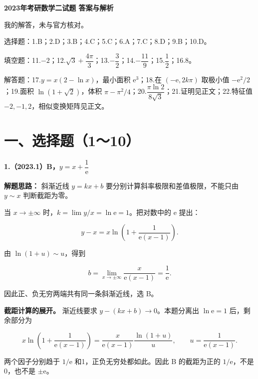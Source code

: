 \documentclass[UTF8,11pt,fontset=windows]{ctexart}
\begin{document}
{\LARGE\bfseries 2023年考研数学二试题 答案与解析\par}\vspace{6pt}

\begingroup\color{gray}我的解答，未与官方核对。\par\endgroup

\begingroup\color{gray}选择题：1.B；2.D；3.B；4.C；5.C；6.A；7.C；8.D；9.B；10.D。\par\endgroup

\begingroup\color{gray}填空题：11.$-2$；12.$\sqrt3+\dfrac{4\pi}{3}$；13.$-\dfrac32$；14.$-\dfrac{11}{9}$；15.$\dfrac12$；16.$8$。\par\endgroup

\begingroup\color{gray}解答题：17.$y=x(2-\ln x)$，最小面积 $\mathrm e^3$；18.在 $(-\mathrm e,2k\pi)$ 取极小值 $-\mathrm e^2/2$；19.面积 $\ln(1+\sqrt2)$，体积 $\pi-\pi^2/4$；20.$\dfrac{\pi\ln2}{8\sqrt3}$；21.证明见正文；22.特征值 $-2,-1,2$，相似变换矩阵见正文。\par\endgroup

\clearpage

\section*{一、选择题（1～10）}

\textbf{1.（2023.1）B，$y=x+\dfrac1{\mathrm e}$}

\textbf{解题思路：} 斜渐近线 $y=kx+b$ 要分别计算斜率极限和差值极限，不能只由 $y\sim x$ 判断截距为零。

当 $x\to\pm\infty$ 时，$k=\lim y/x=\ln\mathrm e=1$。把对数中的 $\mathrm e$ 提出：

$$
y-x=x\ln\left(1+\frac1{\mathrm e(x-1)}\right).
$$

由 $\ln(1+u)\sim u$，得到

$$
b=\lim_{x\to\pm\infty}\frac{x}{\mathrm e(x-1)}=\frac1{\mathrm e}.
$$

因此正、负无穷两端共有同一条斜渐近线，选 B。

\textbf{截距计算的展开。} 渐近线要求 $y-(kx+b)\to0$。本题分离出 $\ln\mathrm e=1$ 后，剩余部分为

$$
x\ln\left(1+\frac1{\mathrm e(x-1)}\right)
=\frac{x}{\mathrm e(x-1)}
\frac{\ln(1+u)}u,
\qquad u=\frac1{\mathrm e(x-1)}.
$$

两个因子分别趋于 $1/\mathrm e$ 和1，正负无穷处都如此。因此 B 的截距为正的 $1/\mathrm e$，不是0，也不是 $\pm\mathrm e$。
\end{document}
